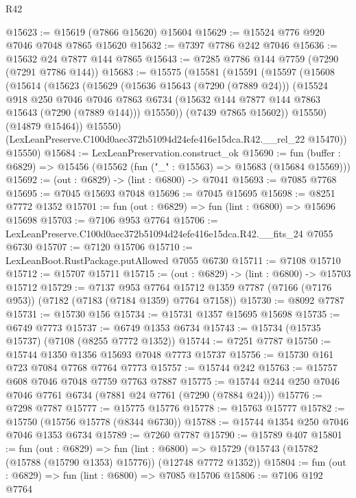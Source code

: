 \begin{lexlean}{R42}
\begin{coremodule}
{@15623 := @15619 (@7866 @15620) @15604
@15629 := @15524 @776 @920 @7046 @7048 @7865 @15620
@15632 := @7397 @7786 @242 @7046
@15636 := @15632 @24 @7877 @144 @7865
@15643 := @7285 @7786 @144 @7759 (@7290 (@7291 @7786 @144))
@15683 := @15575
    (@15581
      (@15591
        (@15597
          (@15608
            (@15614
              (@15623
                (@15629
                  (@15636 @15643 (@7290 (@7889 @24)))
                  (@15524
                    @918
                    @250
                    @7046
                    @7046
                    @7863
                    @6734
                    (@15632 @144 @7877 @144 @7863 @15643 (@7290 (@7889 @144)))
                    @15550))
                (@7439 @7865 @15602))
              @15550)
            (@14879 @15464))
          @15550)
        (LexLeanPreserve.C100d0aec372b51094d24efe416e15dca.R42.__rel_22 @15470))
      @15550)
@15684 := LexLeanPreservation.construct_ok
@15690 := fun (buffer : @6829) => @15456 (@15562 (fun ("_" : @15563) => @15683 (@15684 @15569)))
@15692 := (out : @6829) -> (lint : @6800) -> @7041
@15693 := @7085 @7768
@15695 := @7045 @15693 @7048
@15696 := @7045 @15695
@15698 := @8251 @7772 @1352
@15701 := fun (out : @6829) => fun (lint : @6800) => @15696 @15698
@15703 := @7106 @953 @7764
@15706 := LexLeanPreserve.C100d0aec372b51094d24efe416e15dca.R42.__fits_24 @7055 @6730
@15707 := @7120 @15706
@15710 := LexLeanBoot.RustPackage.putAllowed @7055 @6730
@15711 := @7108 @15710
@15712 := @15707 @15711
@15715 := (out : @6829) -> (lint : @6800) -> @15703 @15712
@15729 := @7137
    @953
    @7764
    @15712
    @1359
    @7787
    (@7166 (@7176 @953))
    (@7182 (@7183 (@7184 @1359) @7764 @7158))
@15730 := @8092 @7787
@15731 := @15730 @156
@15734 := @15731 @1357 @15695 @15698
@15735 := @6749 @7773
@15737 := @6749 @1353 @6734
@15743 := @15734 (@15735 @15737) (@7108 (@8255 @7772 @1352))
@15744 := @7251 @7787
@15750 := @15744 @1350 @1356 @15693 @7048 @7773 @15737
@15756 := @15730 @161 @723 @7084 @7768 @7764 @7773
@15757 := @15744 @242
@15763 := @15757 @608 @7046 @7048 @7759 @7763 @7887
@15775 := @15744 @244 @250 @7046 @7046 @7761 @6734 (@7881 @24 @7761 (@7290 (@7884 @24)))
@15776 := @7298 @7787
@15777 := @15775 @15776
@15778 := @15763 @15777
@15782 := @15750 (@15756 @15778 (@8344 @6730))
@15788 := @15744 @1354 @250 @7046 @7046 @1353 @6734
@15789 := @7260 @7787
@15790 := @15789 @407
@15801 := fun (out : @6829) =>
  fun (lint : @6800) => @15729 (@15743 (@15782 (@15788 (@15790 @1353) @15776)) (@12748 @7772 @1352))
@15804 := fun (out : @6829) => fun (lint : @6800) => @7085 @15706
@15806 := @7106 @192 @7764
}
\end{coremodule}
\end{lexlean}
